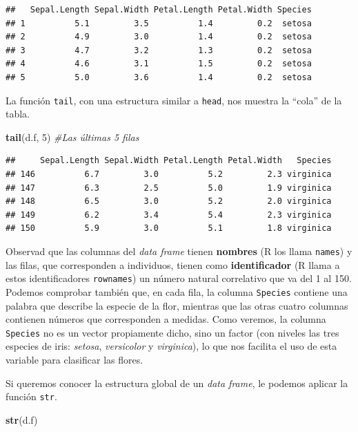\documentclass[]{book}
\newenvironment{Shaded}{\begin{snugshade}}{\end{snugshade}}
\newcommand{\CommentTok}[1]{\textcolor[rgb]{0.56,0.35,0.01}{\textit{#1}}}
\newcommand{\DecValTok}[1]{\textcolor[rgb]{0.00,0.00,0.81}{#1}}
\newcommand{\KeywordTok}[1]{\textcolor[rgb]{0.13,0.29,0.53}{\textbf{#1}}}
\newcommand{\NormalTok}[1]{#1}
\theoremstyle{definition}
\theoremstyle{definition}
\theoremstyle{definition}
\theoremstyle{remark}
\begin{document}
\begin{verbatim}
##   Sepal.Length Sepal.Width Petal.Length Petal.Width Species
## 1          5.1         3.5          1.4         0.2  setosa
## 2          4.9         3.0          1.4         0.2  setosa
## 3          4.7         3.2          1.3         0.2  setosa
## 4          4.6         3.1          1.5         0.2  setosa
## 5          5.0         3.6          1.4         0.2  setosa
\end{verbatim}

La función \texttt{tail}, con una estructura similar a \texttt{head}, nos muestra la ``cola'' de la tabla.

\begin{Shaded}
\begin{Highlighting}[]
\KeywordTok{tail}\NormalTok{(d.f, }\DecValTok{5}\NormalTok{)    }\CommentTok{#Las últimas 5 filas}
\end{Highlighting}
\end{Shaded}

\begin{verbatim}
##     Sepal.Length Sepal.Width Petal.Length Petal.Width   Species
## 146          6.7         3.0          5.2         2.3 virginica
## 147          6.3         2.5          5.0         1.9 virginica
## 148          6.5         3.0          5.2         2.0 virginica
## 149          6.2         3.4          5.4         2.3 virginica
## 150          5.9         3.0          5.1         1.8 virginica
\end{verbatim}

Observad que las columnas del \emph{data frame} tienen \textbf{nombres} (R los llama \texttt{names}) y las filas, que corresponden a individuos, tienen como \textbf{identificador} (R llama a estos identificadores \texttt{rownames}) un número natural correlativo que va del 1 al 150. Podemos comprobar también que, en cada fila, la columna \texttt{Species} contiene una palabra que describe la especie de la flor, mientras que las otras cuatro columnas contienen números que corresponden a medidas.
Como veremos, la columna \texttt{Species} no es un vector propiamente dicho, sino un factor (con niveles las tres especies de iris: \emph{setosa}, \emph{versicolor} y \emph{virginica}), lo que nos facilita el uso de esta variable para clasificar las flores.

Si queremos conocer la estructura global de un \emph{data frame}, le podemos aplicar la función \texttt{str}.

\begin{Shaded}
\begin{Highlighting}[]
\KeywordTok{str}\NormalTok{(d.f)}
\end{Highlighting}
\end{Shaded}
\end{document}
